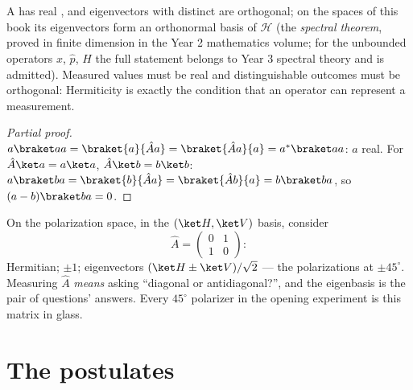 \begin{theorem}\label{thm:b3:quantum-formalism:hermitian}
A  has real , and eigenvectors with
distinct  are orthogonal; on the spaces of this book its
eigenvectors form an orthonormal basis of $\mathcal H$ (the
\emph{spectral theorem}, proved in finite dimension in the Year 2
mathematics volume; for the unbounded operators $\hat x$, $\hat p$,
$\hat H$ the full statement belongs to Year 3 spectral theory and is
admitted). Measured values must be real and distinguishable outcomes
must be orthogonal: Hermiticity is exactly the condition that an
operator can represent a measurement.
\end{theorem}

\begin{proof}[Partial proof]
$a\braket aa = \braket{a}{\hat Aa} = \braket{\hat Aa}{a} =
a^*\braket aa$: $a$ real. For $\hat A\ket a = a\ket a$, $\hat A\ket b
= b\ket b$: $a\braket ba = \braket{b}{\hat Aa} = \braket{\hat
Ab}{a} = b\braket ba$, so $(a - b)\braket ba = 0$.
\end{proof}

\begin{example}\label{ex:b3:quantum-formalism:twolevel}
On the polarization space, in the $(\ket H, \ket V)$ basis, consider
\[
\hat A = \begin{pmatrix} 0 & 1\\ 1 & 0\end{pmatrix} :
\]
Hermitian;  $\pm1$; eigenvectors $(\ket H \pm
\ket V)/\sqrt2$ --- the polarizations at $\pm45^\circ$. Measuring
$\hat A$ \emph{means} asking ``diagonal or antidiagonal?'', and the
eigenbasis is the pair of questions' answers. Every $45^\circ$
polarizer in the opening experiment is this matrix in glass.
\end{example}

\section{The postulates}

